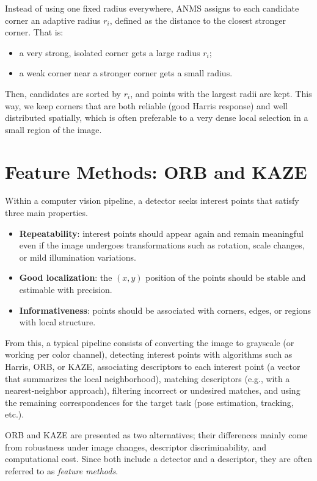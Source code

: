 Instead of using one fixed radius everywhere, ANMS assigns to each
candidate corner an adaptive radius \(r_i\), defined as the distance to the closest
stronger corner.
That is:
\begin{itemize}
    \item a very strong, isolated corner gets a large radius \(r_i\);
    \item a weak corner near a stronger corner gets a small radius.
\end{itemize}

Then, candidates are sorted by \(r_i\), and points with the
largest radii are kept.
This way, we keep corners that are both reliable (good Harris response) and well
distributed spatially, which is often preferable to a very dense
local selection in a small region of the image.

\section{Feature Methods: ORB and KAZE}

Within a computer vision pipeline, a detector seeks interest points that satisfy three main properties.

\begin{itemize}
    \item \textbf{Repeatability}: interest points should appear again and remain meaningful even if the image 
    undergoes transformations such as rotation, scale changes, or mild illumination variations.
    \item \textbf{Good localization}: the $(x,y)$ position of the points should be stable and estimable with 
    precision.
    \item \textbf{Informativeness}: points should be associated with corners, edges, or regions with local structure.
\end{itemize}

From this, a typical pipeline consists of converting the image to grayscale (or working per color channel), 
detecting interest points with algorithms such as Harris, ORB, or KAZE, associating descriptors to each interest 
point (a vector that summarizes the local neighborhood), matching descriptors (e.g., with a nearest-neighbor 
approach), filtering incorrect or undesired matches, and using the remaining correspondences for the target task 
(pose estimation, tracking, etc.).

ORB and KAZE are presented as two alternatives; their differences mainly come from robustness under image changes, 
descriptor discriminability, and computational cost. Since both include a detector and a descriptor, they are often 
referred to as \emph{feature methods}.

